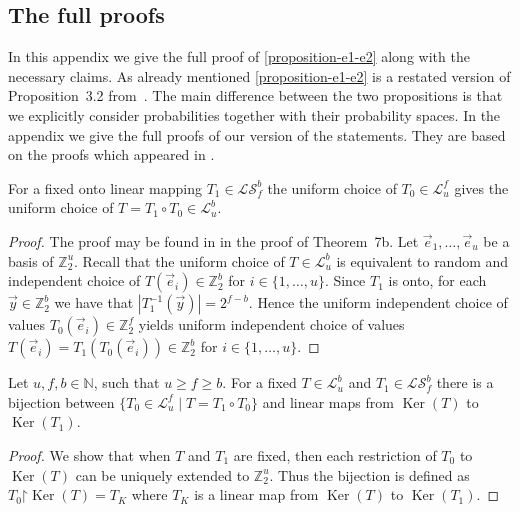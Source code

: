 \documentclass[unicode,review]{siamart1116}
\newcommand{\vecspace}[2]{\mathbb{Z}_{#1}^{#2}}
\newcommand{\binvecspace}[1]{\vecspace{2}{#1}}
\newcommand{\linearmaps}[2]{\mathcal{L}_{#1}^{#2}}
\newcommand{\surjectivelinearmaps}[2]{\mathcal{LS}_{#1}^{#2}}
\numberwithin{theorem}{section}
\begin{document}
\begin{appendix}
\section{The full proofs}
In this appendix we give the full proof of \cref{proposition-e1-e2} along with the necessary claims. 
As already mentioned \cref{proposition-e1-e2} is a restated version of Proposition~3.2 from~\cite{alonetal}.
The main difference between the two propositions is that we explicitly consider probabilities together with their probability spaces.
In the appendix we give the full proofs of our version of the statements.
They are based on the proofs which appeared in \cite{alonetal}.
\begin{proposition}
\label{claim-dstr-factor}
For a fixed onto linear mapping $T_1 \in \surjectivelinearmaps{f}{b}$ the uniform choice of $T_0 \in \linearmaps{u}{f}$ gives the uniform choice of $T = T_1 \circ T_0 \in \linearmaps{u}{b}$.
\end{proposition}
\begin{proof}
The proof may be found in \cite{alonetal} in the proof of Theorem~7b.
Let $\vec{e}_1, \dots, \vec{e}_u$ be a basis of $\binvecspace{u}$.
Recall that the uniform choice of $T \in \linearmaps{u}{b}$ is equivalent to random and independent choice of $T(\vec{e}_i) \in \binvecspace{b}$ for $i \in \{1, \dots, u\}$.
Since $T_1$ is onto, for each $\vec{y} \in \binvecspace{b}$ we have that $|T_1^{-1}(\vec{y})| = 2^{f - b}$.
Hence the uniform independent choice of values $T_0(\vec{e}_i) \in \binvecspace{f}$ yields uniform independent choice of values $T(\vec{e}_i) = T_1(T_0(\vec{e}_i)) \in \binvecspace{b}$ for $i \in \{1, \dots, u\}$.
\end{proof}

\begin{proposition}
\label{proposition-affine-model}
Let $u, f, b \in \mathbb{N}$, such that $u \geq f \geq b$.
For a fixed $T \in \linearmaps{u}{b}$ and $T_1 \in \surjectivelinearmaps{f}{b}$ there is a bijection between $\{ T_0 \in \linearmaps{u}{f} \mid T = T_1 \circ T_0 \}$ and linear maps from $\operatorname{Ker}(T)$ to $\operatorname{Ker}(T_1)$.
\end{proposition}
\begin{proof}
We show that when $T$ and $T_1$ are fixed, then each restriction of $T_0$ to $\operatorname{Ker}(T)$ can be uniquely extended to $\binvecspace{u}$.
Thus the bijection is defined as $T_0\mathord{\upharpoonright}\operatorname{Ker}(T) = T_K$ where $T_K$ is a linear map from $\operatorname{Ker}(T)$ to $\operatorname{Ker}(T_1)$.


\end{proof}
\end{appendix}
\end{document}
